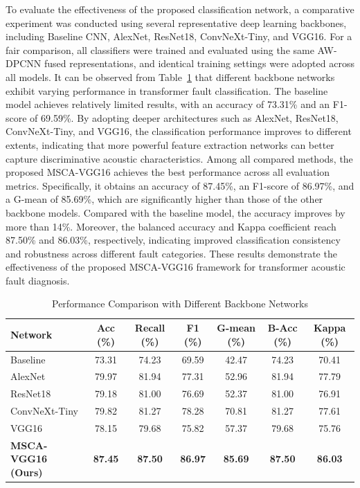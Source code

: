 \documentclass[anonymous]{iopjournal}
\begin{document}
To evaluate the effectiveness of the proposed classification network, a comparative experiment was conducted using several representative deep learning backbones, including Baseline CNN, AlexNet, ResNet18, ConvNeXt-Tiny, and VGG16. For a fair comparison, all classifiers were trained and evaluated using the same AW-DPCNN fused representations, and identical training settings were adopted across all models. It can be observed from Table~\ref{tab:network_comparison} that different backbone networks exhibit varying performance in transformer fault classification. The baseline model achieves relatively limited results, with an accuracy of 73.31\% and an F1-score of 69.59\%. By adopting deeper architectures such as AlexNet, ResNet18, ConvNeXt-Tiny, and VGG16, the classification performance improves to different extents, indicating that more powerful feature extraction networks can better capture discriminative acoustic characteristics. Among all compared methods, the proposed MSCA-VGG16 achieves the best performance across all evaluation metrics. Specifically, it obtains an accuracy of 87.45\%, an F1-score of 86.97\%, and a G-mean of 85.69\%, which are significantly higher than those of the other backbone models. Compared with the baseline model, the accuracy improves by more than 14\%. Moreover, the balanced accuracy and Kappa coefficient reach 87.50\% and 86.03\%, respectively, indicating improved classification consistency and robustness across different fault categories. These results demonstrate the effectiveness of the proposed MSCA-VGG16 framework for transformer acoustic fault diagnosis.
\begin{table}
	\centering
	\caption{Performance Comparison with Different Backbone Networks}
	\label{tab:network_comparison}
	\begin{tabular}{lcccccc}
		\toprule
		\textbf{Network} 
		& \textbf{Acc (\%)} 
		& \textbf{Recall (\%)} 
		& \textbf{F1 (\%)} 
		& \textbf{G-mean (\%)} 
		& \textbf{B-Acc (\%)} 
		& \textbf{Kappa (\%)} \\
		\midrule
		Baseline &73.31 &74.23 &69.59 &42.47 &74.23 &70.41 \\
		AlexNet &79.97 &81.94 &77.31 &52.96 &81.94 &77.79 \\
		ResNet18 &79.18 &81.00 &76.69 &52.37 &81.00 &76.91 \\
		ConvNeXt-Tiny &79.82 &81.27 &78.28 &70.81 &81.27 &77.61 \\
		VGG16 &78.15 &79.68 &75.82 &57.37 &79.68 &75.76 \\
		\textbf{MSCA-VGG16 (Ours)} 
		& \textbf{87.45} & \textbf{87.50} 
		& \textbf{86.97} & \textbf{85.69} 
		& \textbf{87.50} & \textbf{86.03} \\
		\bottomrule
	\end{tabular}
\end{table}
\end{document}
